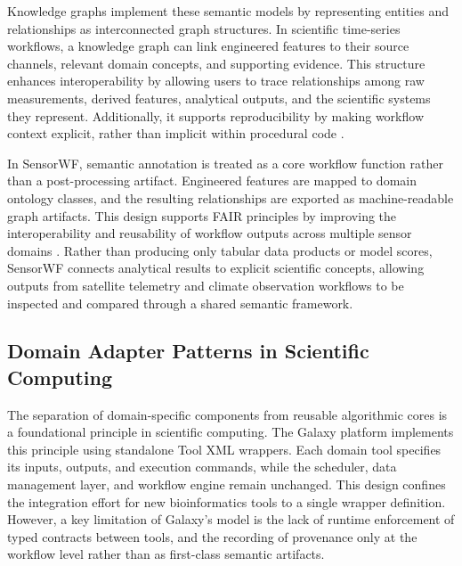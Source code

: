 \documentclass[conference]{IEEEtran}
\newcommand\Alex[1]{\leavevmode{\footnotesize\textbf{\hl{[Alex: #1]}}}}
\begin{document}
Knowledge graphs implement these semantic models by representing entities and relationships as interconnected graph structures. In scientific time-series workflows, a knowledge graph can link engineered features to their source channels, relevant domain concepts, and supporting evidence. This structure enhances interoperability by allowing users to trace relationships among raw measurements, derived features, analytical outputs, and the scientific systems they represent. Additionally, it supports reproducibility by making workflow context explicit, rather than implicit within procedural code \cite{provo2013,missier2013provone}.



In SensorWF, semantic annotation is treated as a core workflow function rather than a post-processing artifact. Engineered features are mapped to domain ontology classes, and the resulting relationships are exported as machine-readable graph artifacts. This design supports FAIR principles by improving the interoperability and reusability of workflow outputs across multiple sensor domains \cite{wilkinson2016fair,gustafsson2025workflowhub}. Rather than producing only tabular data products or model scores, SensorWF connects analytical results to explicit scientific concepts, allowing outputs from satellite telemetry and climate observation workflows to be inspected and compared through a shared semantic framework.

\subsection{Domain Adapter Patterns in Scientific Computing}

The separation of domain-specific components from reusable algorithmic cores is a foundational principle in scientific computing. The Galaxy platform \cite{afgan2018galaxy} implements this principle using standalone Tool XML wrappers. Each domain tool specifies its inputs, outputs, and execution commands, while the scheduler, data management layer, and workflow engine remain unchanged. This design confines the integration effort for new bioinformatics tools to a single wrapper definition. However, a key limitation of Galaxy's model is the lack of runtime enforcement of typed contracts between tools, and the recording of provenance only at the workflow level rather than as first-class semantic artifacts.
\end{document}
